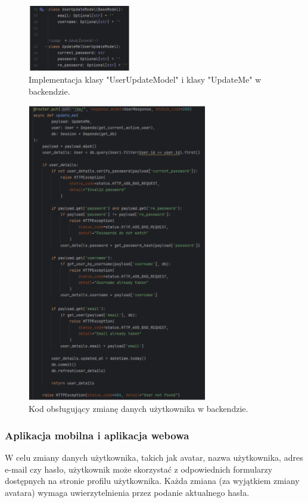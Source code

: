 \begin{figure}[H]
    \centering
    \includegraphics[width=0.4\textwidth]{chapters/chapter_8/screens/edit_user_backend_1}
    \caption{Implementacja klasy "UserUpdateModel" i klasy "UpdateMe" w backendzie.}
    \label{img:edit_user_backend_1}
\end{figure}

\begin{figure}[H]
    \centering
    \includegraphics[width=0.7\textwidth]{chapters/chapter_8/screens/edit_user_backend_2}
    \caption{Kod obsługujący zmianę danych użytkownika w backendzie.}
    \label{img:edit_user_backend_2}
\end{figure}

\subsubsection{Aplikacja mobilna i aplikacja webowa}
W celu zmiany danych użytkownika, takich jak avatar, nazwa użytkownika, adres e-mail czy hasło, użytkownik może skorzystać z odpowiednich formularzy dostępnych na stronie profilu użytkownika. Każda zmiana (za wyjątkiem zmiany avatara) wymaga uwierzytelnienia przez podanie aktualnego hasła.

